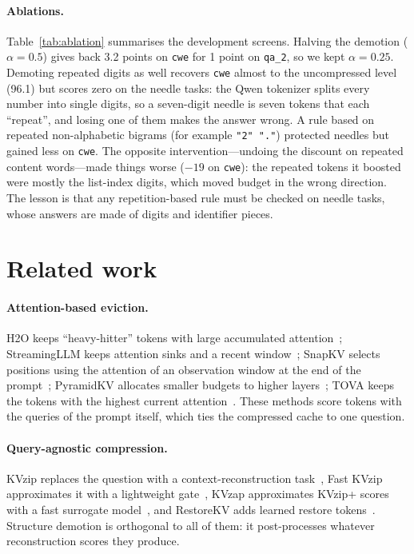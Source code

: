 \documentclass[11pt]{article}
\begin{document}
\paragraph{Ablations.} Table~\ref{tab:ablation} summarises the development screens. Halving the demotion ($\alpha=0.5$) gives back
3.2 points on \texttt{cwe} for 1 point on \texttt{qa\_2}, so we kept $\alpha=0.25$. Demoting repeated digits as well recovers
\texttt{cwe} almost to the uncompressed level (96.1) but scores zero on the needle tasks: the Qwen tokenizer splits every number
into single digits, so a seven-digit needle is seven tokens that each ``repeat'', and losing one of them makes the answer wrong. A
rule based on repeated non-alphabetic bigrams (for example \texttt{"2"~"."}) protected needles but gained less on \texttt{cwe}.
The opposite intervention---undoing the discount on repeated content words---made things worse ($-19$ on \texttt{cwe}): the
repeated tokens it boosted were mostly the list-index digits, which moved budget in the wrong direction. The lesson is that any
repetition-based rule must be checked on needle tasks, whose answers are made of digits and identifier pieces.

\section{Related work}
\paragraph{Attention-based eviction.} H2O keeps ``heavy-hitter'' tokens with large accumulated attention~\cite{zhang2023h2o};
StreamingLLM keeps attention sinks and a recent window~\cite{xiao2024streamingllm}; SnapKV selects positions using the attention of
an observation window at the end of the prompt~\cite{li2024snapkv}; PyramidKV allocates smaller budgets to higher
layers~\cite{cai2024pyramidkv}; TOVA keeps the tokens with the highest current attention~\cite{oren2024tova}. These methods score
tokens with the queries of the prompt itself, which ties the compressed cache to one question.

\paragraph{Query-agnostic compression.} KVzip replaces the question with a context-reconstruction task~\cite{kim2025kvzip}, Fast
KVzip approximates it with a lightweight gate~\cite{kim2026fastkvzip}, KVzap approximates KVzip+ scores with a fast surrogate
model~\cite{jegou2026kvzap}, and RestoreKV adds learned restore tokens~\cite{baek2026restorekv}. Structure demotion is orthogonal
to all of them: it post-processes whatever reconstruction scores they produce.
\end{document}
